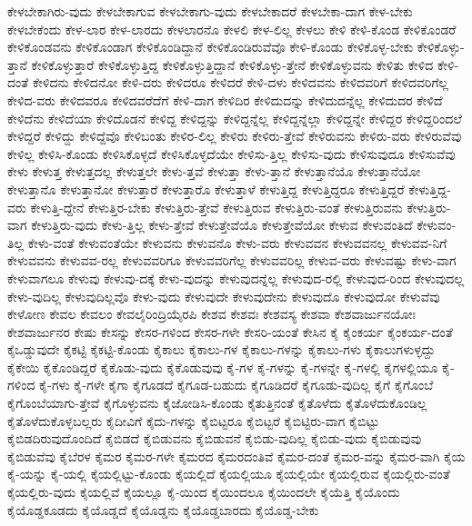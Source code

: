 {ಕೇಳಬೇಕಾಗಿರು-ವುದು
ಕೇಳಬೇಕಾಗುವ
ಕೇಳಬೇಕಾಗು-ವುದು
ಕೇಳಬೇಕಾದರೆ
ಕೇಳಬೇಕಾ-ದಾಗ
ಕೇಳ-ಬೇಕು
ಕೇಳಬೇಕೆಂದು
ಕೇಳ-ಲಾರ
ಕೇಳ-ಲಾರದು
ಕೇಳಲಾರನೊ
ಕೇಳಲಿ
ಕೇಳ-ಲಿಲ್ಲ
ಕೇಳಲು
ಕೇಳಿ
ಕೇಳಿ-ಕೊಂಡ
ಕೇಳಿಕೊಂಡರೆ
ಕೇಳಿಕೊಂಡವನು
ಕೇಳಿಕೊಂಡಾಗ
ಕೇಳಿಕೊಂಡಿದ್ದಾನೆ
ಕೇಳಿಕೊಂಡಿರುವೆವೊ
ಕೇಳಿ-ಕೊಂಡು
ಕೇಳಿಕೊಳ್ಳ-ಬೇಕು
ಕೇಳಿಕೊಳ್ಳು-ತ್ತಾನೆ
ಕೇಳಿಕೊಳ್ಳುತ್ತಾರೆ
ಕೇಳಿಕೊಳ್ಳುತ್ತಿದ್ದ
ಕೇಳಿಕೊಳ್ಳುತ್ತಿದ್ದಾನೆ
ಕೇಳಿಕೊಳ್ಳು-ತ್ತೇನೆ
ಕೇಳಿಕೊಳ್ಳುವನು
ಕೇಳಿತು
ಕೇಳಿದ
ಕೇಳಿ-ದಂತೆ
ಕೇಳಿದನು
ಕೇಳಿದನೋ
ಕೇಳಿ-ದರು
ಕೇಳಿದರೂ
ಕೇಳಿದರೆ
ಕೇಳಿ-ದಳು
ಕೇಳಿದವನು
ಕೇಳಿದವರಿಗೆ
ಕೇಳಿದವರಿಗೆಲ್ಲ
ಕೇಳಿದ-ವರು
ಕೇಳಿದವರೂ
ಕೇಳಿದವರೆದೆಗೆ
ಕೇಳಿ-ದಾಗ
ಕೇಳಿದಿರ
ಕೇಳಿದುದನ್ನು
ಕೇಳಿದುದನ್ನೆಲ್ಲ
ಕೇಳಿದುದರ
ಕೇಳಿದೆ
ಕೇಳಿದೆನು
ಕೇಳಿದೆಯಾ
ಕೇಳಿದೊಡನೆ
ಕೇಳಿದ್ದ
ಕೇಳಿದ್ದನ್ನು
ಕೇಳಿದ್ದನ್ನೆಲ್ಲ
ಕೇಳಿದ್ದನ್ನೆಲ್ಲಾ
ಕೇಳಿದ್ದನ್ನೇ
ಕೇಳಿದ್ದರ
ಕೇಳಿದ್ದರಿಂದಲೆ
ಕೇಳಿದ್ದರೆ
ಕೇಳಿದ್ದು
ಕೇಳಿದ್ದೆವೊ
ಕೇಳಿಬಂತು
ಕೇಳಿರ-ಲಿಲ್ಲ
ಕೇಳಿರು
ಕೇಳಿರು-ತ್ತೇವೆ
ಕೇಳಿರುವನು
ಕೇಳಿರು-ವರು
ಕೇಳಿರುವೆವು
ಕೇಳಿಲ್ಲ
ಕೇಳಿಸಿ-ಕೊಂಡು
ಕೇಳಿಸಿಕೊಳ್ಳದೆ
ಕೇಳಿಸಿಕೊಳ್ಳದೆಯೇ
ಕೇಳಿಸು-ತ್ತಿಲ್ಲ
ಕೇಳಿಸು-ವುದು
ಕೇಳಿಸುವುದೂ
ಕೇಳಿಸುವೆವು
ಕೇಳು
ಕೇಳುತ್ತ
ಕೇಳುತ್ತದಲ್ಲ
ಕೇಳುತ್ತಲೇ
ಕೇಳು-ತ್ತವೆ
ಕೇಳುತ್ತಾ
ಕೇಳು-ತ್ತಾನೆ
ಕೇಳುತ್ತಾನೆಯೊ
ಕೇಳುತ್ತಾನೆಯೋ
ಕೇಳುತ್ತಾನೊ
ಕೇಳುತ್ತಾನೋ
ಕೇಳುತ್ತಾರೆ
ಕೇಳುತ್ತಾರೊ
ಕೇಳುತ್ತಾಳೆ
ಕೇಳುತ್ತಿದ್ದ
ಕೇಳುತ್ತಿದ್ದರೂ
ಕೇಳುತ್ತಿದ್ದರೆ
ಕೇಳುತ್ತಿದ್ದ-ವರು
ಕೇಳುತ್ತಿ-ದ್ದೇನೆ
ಕೇಳುತ್ತಿರ-ಬೇಕು
ಕೇಳುತ್ತಿರು-ತ್ತೇವೆ
ಕೇಳುತ್ತಿರುವ
ಕೇಳುತ್ತಿರು-ವಂತೆ
ಕೇಳುತ್ತಿರುವನು
ಕೇಳುತ್ತಿರು-ವಾಗ
ಕೇಳುತ್ತಿರು-ವುದು
ಕೇಳು-ತ್ತಿಲ್ಲ
ಕೇಳು-ತ್ತೇವೆ
ಕೇಳುತ್ತೇವೆಯೊ
ಕೇಳುತ್ತೇವೆಯೋ
ಕೇಳುವ
ಕೇಳುವಂತಿದೆ
ಕೇಳುವಂ-ತಿಲ್ಲ
ಕೇಳು-ವಂತೆ
ಕೇಳುವಂತೆಯೇ
ಕೇಳುವನು
ಕೇಳುವನೊ
ಕೇಳು-ವರು
ಕೇಳುವವನ
ಕೇಳುವವನಲ್ಲ
ಕೇಳುವವ-ನಿಗೆ
ಕೇಳುವವನು
ಕೇಳುವವ-ರಲ್ಲ
ಕೇಳುವವರಿಗೂ
ಕೇಳುವವರಿಗೆಲ್ಲ
ಕೇಳುವವರಿಲ್ಲ
ಕೇಳುವ-ವರು
ಕೇಳುವಷ್ಟು
ಕೇಳು-ವಾಗ
ಕೇಳುವಾಗಲೂ
ಕೇಳುವು
ಕೇಳುವು-ದಕ್ಕೆ
ಕೇಳು-ವುದನ್ನು
ಕೇಳುವುದನ್ನೆಲ್ಲ
ಕೇಳುವುದ-ರಲ್ಲಿ
ಕೇಳುವುದ-ರಿಂದ
ಕೇಳುವುದಲ್ಲ
ಕೇಳು-ವುದಿಲ್ಲ
ಕೇಳುವುದಿಲ್ಲವೊ
ಕೇಳು-ವುದು
ಕೇಳುವುದೇ
ಕೇಳುವುದೇನು
ಕೇಳುವುದೊ
ಕೇಳುವುದೋ
ಕೇಳುವೆವು
ಕೇಳೋಣ
ಕೇವಲ
ಕೇವಲಂ
ಕೇವಲೈರಿಂದ್ರಿಯೈರಪಿ
ಕೇಶವ
ಕೇಶವಃ
ಕೇಶವಸ್ಯ
ಕೇಶವಾ
ಕೇಶವಾರ್ಜುನಯೋಃ
ಕೇಶವಾರ್ಜುನರ
ಕೇಷು
ಕೇಸನ್ನು
ಕೇಸರ-ಗಳಿಂದ
ಕೇಸರ-ಗಳೇ
ಕೇಸರಿ-ಯಂತೆ
ಕೇಸಿನ
ಕೈ
ಕೈಂಕರ್ಯ
ಕೈಂಕರ್ಯ-ದಂತೆ
ಕೈಒಡ್ಡುವುದೇ
ಕೈಕಟ್ಟಿ
ಕೈಕಟ್ಟಿ-ಕೊಂಡು
ಕೈಕಾಲು
ಕೈಕಾಲು-ಗಳ
ಕೈಕಾಲು-ಗಳನ್ನು
ಕೈಕಾಲು-ಗಳು
ಕೈಕಾಲುಗಳುಳ್ಳದ್ದು
ಕೈಕೇಯಿ
ಕೈಕೊಂಡಿದ್ದರೆ
ಕೈಕೊಡು-ವುದು
ಕೈಕೊಡುವುವು
ಕೈ-ಗಳ
ಕೈ-ಗಳನ್ನು
ಕೈ-ಗಳನ್ನೇ
ಕೈ-ಗಳಲ್ಲಿ
ಕೈಗಳಲ್ಲಿಯೂ
ಕೈ-ಗಳಿಂದ
ಕೈ-ಗಳು
ಕೈ-ಗಳೇ
ಕೈಗಾ
ಕೈಗೂಡದೆ
ಕೈಗೂಡ-ಬಹುದು
ಕೈಗೂಡಿದರೆ
ಕೈಗೂಡು-ವುದಿಲ್ಲ
ಕೈಗೆ
ಕೈಗೊಂಬೆ
ಕೈಗೊಂಬೆಯಾಗು-ತ್ತೇವೆ
ಕೈಗೊಳ್ಳುವನು
ಕೈಜೋಡಿಸಿ-ಕೊಂಡು
ಕೈತುತ್ತಿನಂತೆ
ಕೈತೊಳೆದು
ಕೈತೊಳೆದುಕೊಂಡಿಲ್ಲ
ಕೈತೊಳೆದುಕೊಳ್ಳಬಲ್ಲರು
ಕೈದೀವಿಗೆ
ಕೈದು-ಗಳನ್ನು
ಕೈಬಿಟ್ಟರೂ
ಕೈಬಿಟ್ಟರೆ
ಕೈಬಿಟ್ಟಿರು-ವಾಗ
ಕೈಬಿಟ್ಟು
ಕೈಬಿಡದಿರುವುದೊಂದಿದೆ
ಕೈಬಿಡದೆ
ಕೈಬಿಡುವನು
ಕೈಬಿಡುವನೆ
ಕೈಬಿಡು-ವುದಿಲ್ಲ
ಕೈಬಿಡು-ವುದು
ಕೈಬಿಡುವುವು
ಕೈಬಿಡುವೆವು
ಕೈಬೆರಳ
ಕೈಮರ
ಕೈಮರ-ಗಳೇ
ಕೈಮರದ
ಕೈಮರದಂತಿವೆ
ಕೈಮರ-ದಂತೆ
ಕೈಮರ-ವನ್ನು
ಕೈಮರ-ವಾಗಿ
ಕೈಯ
ಕೈ-ಯನ್ನು
ಕೈ-ಯಲ್ಲಿ
ಕೈಯಲ್ಲಿಟ್ಟು-ಕೊಂಡು
ಕೈಯಲ್ಲಿದೆ
ಕೈಯಲ್ಲಿಯೂ
ಕೈಯಲ್ಲಿಯೇ
ಕೈಯಲ್ಲಿರುವ
ಕೈಯಲ್ಲಿರು-ವಂತೆ
ಕೈಯಲ್ಲಿರು-ವುದು
ಕೈಯಲ್ಲಿವೆ
ಕೈಯಲ್ಲೂ
ಕೈ-ಯಿಂದ
ಕೈಯಿಂದಲೂ
ಕೈಯಿಂದಲೇ
ಕೈಯೆತ್ತಿ
ಕೈಯೊಂದು
ಕೈಯೊಡ್ಡಕೂಡದು
ಕೈಯೊಡ್ಡದೆ
ಕೈಯೊಡ್ಡನು
ಕೈಯೊಡ್ಡಬಾರದು
ಕೈಯೊಡ್ಡ-ಬೇಕು
}
